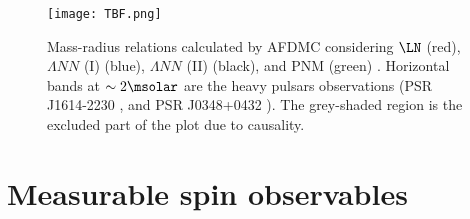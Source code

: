 \begin{figure}[h]
  \begin{center}
   \texttt{[image: TBF.png]}
   \caption{Mass-radius relations calculated by AFDMC considering $\LN$ (red), $\Lambda NN$ (I) (blue), $\Lambda NN$ (II) (black), and PNM (green) \cite{Diego-2015}. Horizontal bands at $\sim2\msolar$ are the heavy pulsars observations (PSR J1614-2230 \cite{NS-1}, and PSR J0348+0432 \cite{NS-2}). The grey-shaded region is the excluded part of the plot due to causality.}
   \label{fig-TBF}
 \end{center}
\end{figure}






\clearpage
\section{Measurable spin observables}

\begin{comment}
\subsection{Differential cross-section}
To experimentally obtain information on the two-body interaction potential, measuring the differential cross-section $d\sigma/d\Omega$ and determining its scattering phase difference $\delta$ is necessary. The differential cross-section derived from the scattering amplitude $f(\theta)$ expanded by the orbital angular momentum $l$ is given by 
\begin{equation}
  \frac{d\sigma}{d\Omega}(\theta) = |f(\theta)|^2 = \left| \cfrac{1}{k}\sum_{l=0}^\infty (2l+1)e^{i\delta_l}\sin\delta_l P_l (\cos\theta)\right|^2,
  \label{eq: potential}
\end{equation}
where $k$ is the wavenumber, $P_l$ is the $l^{\rm th}$ Legendre polynomial, and spin weights are not considered. $\delta_l$ is the phase difference between the waves scattered by the potential of a partial wave with angular momentum $l$ and unscattered waves. When $\delta_l<0$, the potential is repulsive, and when $\delta_l>0$, the potential is attractive.

For the $\LN$ interaction, the contribution of the (${\bf 27}$) term in the spin-singlet can be estimated from the abundant experimental data of $NN$ scattering as in the $\SN$ interaction. The theoretical indeterminacy of the phase difference in the (${\bf 27}$) is expected to be very small. The spin-singlet and spin-triplet contributions can be constrained if the J-PARC E40 experiment determines the $\SN$ interaction.
\end{comment}

